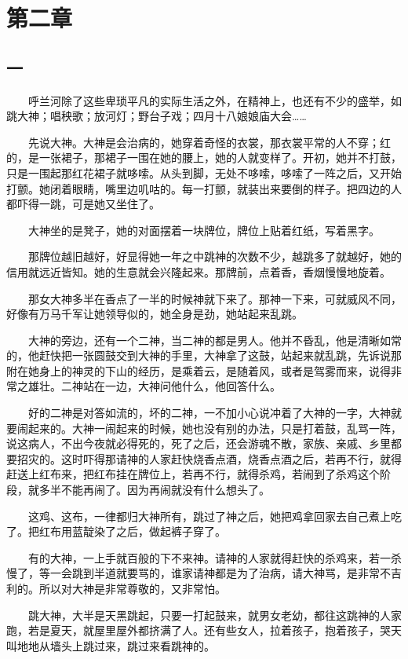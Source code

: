\documentclass[UTF8]{ctexart}
\begin{document}
\section{第二章}

\subsection{一}

　　呼兰河除了这些卑琐平凡的实际生活之外，在精神上，也还有不少的盛举，如跳大神；唱秧歌；放河灯；野台子戏；四月十八娘娘庙大会……

　　先说大神。大神是会治病的，她穿着奇怪的衣裳，那衣裳平常的人不穿；红的，是一张裙子，那裙子一围在她的腰上，她的人就变样了。开初，她并不打鼓，只是一围起那红花裙子就哆嗦。从头到脚，无处不哆嗦，哆嗦了一阵之后，又开始打颤。她闭着眼睛，嘴里边叽咕的。每一打颤，就装出来要倒的样子。把四边的人都吓得一跳，可是她又坐住了。

　　大神坐的是凳子，她的对面摆着一块牌位，牌位上贴着红纸，写着黑字。

　　那牌位越旧越好，好显得她一年之中跳神的次数不少，越跳多了就越好，她的信用就远近皆知。她的生意就会兴隆起来。那牌前，点着香，香烟慢慢地旋着。

　　那女大神多半在香点了一半的时候神就下来了。那神一下来，可就威风不同，好像有万马千军让她领导似的，她全身是劲，她站起来乱跳。

　　大神的旁边，还有一个二神，当二神的都是男人。他并不昏乱，他是清晰如常的，他赶快把一张圆鼓交到大神的手里，大神拿了这鼓，站起来就乱跳，先诉说那附在她身上的神灵的下山的经历，是乘着云，是随着风，或者是驾雾而来，说得非常之雄壮。二神站在一边，大神问他什么，他回答什么。

　　好的二神是对答如流的，坏的二神，一不加小心说冲着了大神的一字，大神就要闹起来的。大神一闹起来的时候，她也没有别的办法，只是打着鼓，乱骂一阵，说这病人，不出今夜就必得死的，死了之后，还会游魂不散，家族、亲戚、乡里都要招灾的。这时吓得那请神的人家赶快烧香点酒，烧香点酒之后，若再不行，就得赶送上红布来，把红布挂在牌位上，若再不行，就得杀鸡，若闹到了杀鸡这个阶段，就多半不能再闹了。因为再闹就没有什么想头了。

　　这鸡、这布，一律都归大神所有，跳过了神之后，她把鸡拿回家去自己煮上吃了。把红布用蓝靛染了之后，做起裤子穿了。

　　有的大神，一上手就百般的下不来神。请神的人家就得赶快的杀鸡来，若一杀慢了，等一会跳到半道就要骂的，谁家请神都是为了治病，请大神骂，是非常不吉利的。所以对大神是非常尊敬的，又非常怕。

　　跳大神，大半是天黑跳起，只要一打起鼓来，就男女老幼，都往这跳神的人家跑，若是夏天，就屋里屋外都挤满了人。还有些女人，拉着孩子，抱着孩子，哭天叫地地从墙头上跳过来，跳过来看跳神的。
\end{document}
